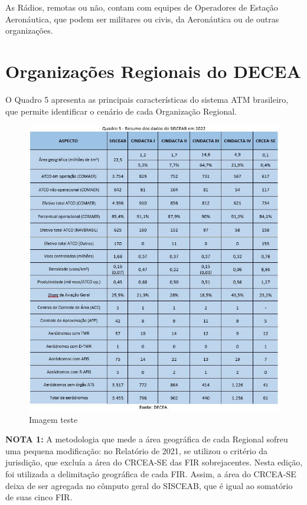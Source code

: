 \documentclass[
]{book}
\begin{document}
As Rádios, remotas ou não, contam com equipes de Operadores de Estação Aeronáutica, que podem ser militares ou civis, da Aeronáutica ou de outras organizações.

\hypertarget{organizauxe7uxf5es-regionais-do-decea}{%
\section{Organizações Regionais do DECEA}\label{organizauxe7uxf5es-regionais-do-decea}}

O Quadro 5 apresenta as principais características do sistema ATM brasileiro, que permite identificar o cenário de cada Organização Regional.

\begin{figure}
\centering
\includegraphics{imagens/fig11.jpg}
\caption{Imagem teste}
\end{figure}

\textbf{NOTA 1:} A metodologia que mede a área geográfica de cada Regional sofreu uma pequena modificação: no Relatório de 2021, se utilizou o critério da jurisdição, que excluía a área do CRCEA-SE das FIR sobrejacentes. Nesta edição, foi utilizada a delimitação geográfica de cada FIR. Assim, a área do CRCEA-SE deixa de ser agregada no cômputo geral do SISCEAB, que é igual ao somatório de suas cinco FIR.
\end{document}
